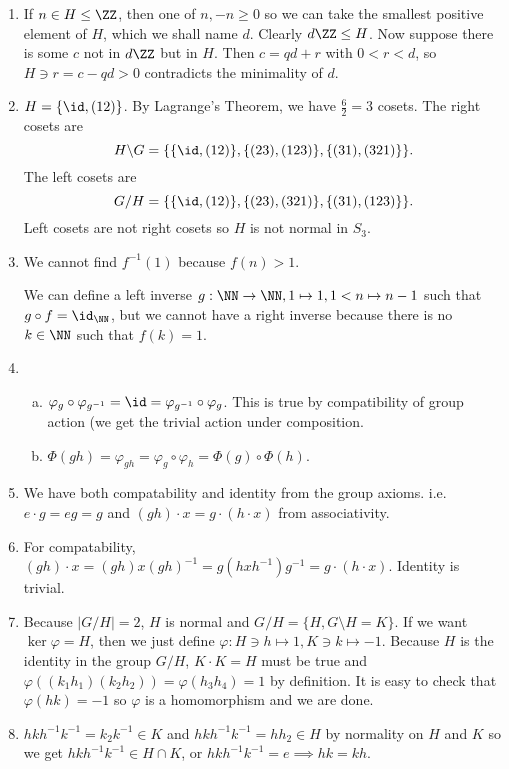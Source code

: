 \documentclass{article}
\begin{document}
\begin{enumerate}

\item If $n \in H \leq \ZZ$, then one of $n, -n \geq 0$ so we can take
the smallest positive element of $H$, which we shall name $d$. Clearly
$d\ZZ \leq H$. Now suppose there is some $c$ not in $d\ZZ$ but in $H$.
Then $c = qd + r$ with $0 < r < d$, so $H \ni r = c - qd > 0$
contradicts the minimality of $d$.

\item $H = \lbrace \id, (12) \rbrace$. By Lagrange's Theorem, we have
$\frac{6}{2} = 3$ cosets. The right cosets are
\[ H \backslash G = \lbrace \lbrace \id, (12) \rbrace, \lbrace (23),
(123) \rbrace, \lbrace (31), (321) \rbrace \rbrace. \]
The left cosets are
\[ G / H = \lbrace \lbrace \id, (12) \rbrace, \lbrace (23), (321)
\rbrace, \lbrace (31), (123) \rbrace \rbrace. \]
Left cosets are not right cosets so $H$ is not normal in $S_3$.

\item We cannot find $f^{-1}(1)$ because $f(n) > 1$.

We can define a left inverse $g : \NN \to \NN, 1 \mapsto 1, 1 < n
\mapsto n - 1$ such that $g \circ f = \id_\NN$, but we cannot have a
right inverse because there is no $k \in \NN$ such that $f(k) = 1$.

\item
\begin{enumerate}[(a)]
\item $\varphi_g \circ \varphi_{g^{-1}} = \id = \varphi_{g^{-1}} \circ
\varphi_g$. This is true by compatibility of group action (we get the
trivial action under composition.

\item $\Phi(gh) = \varphi_{gh} = \varphi_g \circ \varphi_h = \Phi(g)
\circ \Phi(h)$.
\end{enumerate}

\item We have both compatability and identity from the group axioms.
i.e. $e \cdot g = eg = g$ and $(gh) \cdot x = g \cdot (h \cdot x)$ from
associativity.

\item For compatability, $(gh) \cdot x = (gh)x(gh)^{-1} =
g(hxh^{-1})g^{-1} = g \cdot (h \cdot x)$. Identity is trivial.

\item Because $\lvert G / H \rvert = 2$, $H$ is normal and $G / H =
\lbrace H, G \setminus H = K \rbrace$. If we want $\ker \varphi = H$,
then we just define $\varphi : H \ni h \mapsto 1, K \ni k \mapsto -1$.
Because $H$ is the identity in the group $G / H$, $K \cdot K = H$ must
be true and $\varphi((k_1h_1)(k_2h_2)) = \varphi(h_3 h_4) = 1$ by
definition. It is easy to check that $\varphi(hk) = -1$ so $\varphi$ is
a homomorphism and we are done.

\item $hkh^{-1}k^{-1} = k_2k^{-1} \in K$ and $hkh^{-1}k^{-1} = hh_2 \in
H$ by normality on $H$ and $K$ so we get $hkh^{-1}k^{-1} \in H \cap K$,
or $hkh^{-1}k^{-1} = e \implies hk = kh$.

\end{enumerate}
\end{document}
